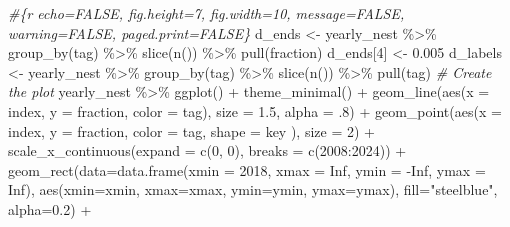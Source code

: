 \documentclass[
]{article}
\newenvironment{Shaded}{\begin{snugshade}}{\end{snugshade}}
\newcommand{\AttributeTok}[1]{\textcolor[rgb]{0.77,0.63,0.00}{#1}}
\newcommand{\CommentTok}[1]{\textcolor[rgb]{0.56,0.35,0.01}{\textit{#1}}}
\newcommand{\ConstantTok}[1]{\textcolor[rgb]{0.00,0.00,0.00}{#1}}
\newcommand{\DecValTok}[1]{\textcolor[rgb]{0.00,0.00,0.81}{#1}}
\newcommand{\FloatTok}[1]{\textcolor[rgb]{0.00,0.00,0.81}{#1}}
\newcommand{\FunctionTok}[1]{\textcolor[rgb]{0.00,0.00,0.00}{#1}}
\newcommand{\NormalTok}[1]{#1}
\newcommand{\OtherTok}[1]{\textcolor[rgb]{0.56,0.35,0.01}{#1}}
\newcommand{\SpecialCharTok}[1]{\textcolor[rgb]{0.00,0.00,0.00}{#1}}
\newcommand{\StringTok}[1]{\textcolor[rgb]{0.31,0.60,0.02}{#1}}
\begin{document}
\begin{Shaded}
\begin{Highlighting}[]
\CommentTok{\#\{r echo=FALSE, fig.height=7, fig.width=10, message=FALSE, warning=FALSE, paged.print=FALSE\}}
\NormalTok{d\_ends }\OtherTok{\textless{}{-}}\NormalTok{ yearly\_nest }\SpecialCharTok{\%\textgreater{}\%} 
  \FunctionTok{group\_by}\NormalTok{(tag) }\SpecialCharTok{\%\textgreater{}\%} 
  \FunctionTok{slice}\NormalTok{(}\FunctionTok{n}\NormalTok{()) }\SpecialCharTok{\%\textgreater{}\%} 
  \FunctionTok{pull}\NormalTok{(fraction)}
\NormalTok{d\_ends[}\DecValTok{4}\NormalTok{] }\OtherTok{\textless{}{-}} \FloatTok{0.005}
\NormalTok{d\_labels }\OtherTok{\textless{}{-}}\NormalTok{ yearly\_nest }\SpecialCharTok{\%\textgreater{}\%} 
  \FunctionTok{group\_by}\NormalTok{(tag) }\SpecialCharTok{\%\textgreater{}\%} 
  \FunctionTok{slice}\NormalTok{(}\FunctionTok{n}\NormalTok{()) }\SpecialCharTok{\%\textgreater{}\%} 
  \FunctionTok{pull}\NormalTok{(tag)}
\CommentTok{\# Create the plot }
\NormalTok{yearly\_nest }\SpecialCharTok{\%\textgreater{}\%} 
  \FunctionTok{ggplot}\NormalTok{() }\SpecialCharTok{+}
  \FunctionTok{theme\_minimal}\NormalTok{() }\SpecialCharTok{+}
  \FunctionTok{geom\_line}\NormalTok{(}\FunctionTok{aes}\NormalTok{(}\AttributeTok{x =}\NormalTok{ index, }\AttributeTok{y =}\NormalTok{ fraction, }\AttributeTok{color =}\NormalTok{ tag), }\AttributeTok{size =} \FloatTok{1.5}\NormalTok{, }\AttributeTok{alpha =}\NormalTok{ .}\DecValTok{8}\NormalTok{) }\SpecialCharTok{+}
  \FunctionTok{geom\_point}\NormalTok{(}\FunctionTok{aes}\NormalTok{(}\AttributeTok{x =}\NormalTok{ index, }\AttributeTok{y =}\NormalTok{ fraction, }\AttributeTok{color =}\NormalTok{ tag, }\AttributeTok{shape =}\NormalTok{ key ), }\AttributeTok{size =} \DecValTok{2}\NormalTok{) }\SpecialCharTok{+}
  \FunctionTok{scale\_x\_continuous}\NormalTok{(}\AttributeTok{expand =} \FunctionTok{c}\NormalTok{(}\DecValTok{0}\NormalTok{, }\DecValTok{0}\NormalTok{), }\AttributeTok{breaks =} \FunctionTok{c}\NormalTok{(}\DecValTok{2008}\SpecialCharTok{:}\DecValTok{2024}\NormalTok{)) }\SpecialCharTok{+}
  \FunctionTok{geom\_rect}\NormalTok{(}\AttributeTok{data=}\FunctionTok{data.frame}\NormalTok{(}\AttributeTok{xmin =} \DecValTok{2018}\NormalTok{, }\AttributeTok{xmax =} \ConstantTok{Inf}\NormalTok{, }\AttributeTok{ymin =} \SpecialCharTok{{-}}\ConstantTok{Inf}\NormalTok{, }\AttributeTok{ymax =} \ConstantTok{Inf}\NormalTok{),}
            \FunctionTok{aes}\NormalTok{(}\AttributeTok{xmin=}\NormalTok{xmin, }\AttributeTok{xmax=}\NormalTok{xmax, }\AttributeTok{ymin=}\NormalTok{ymin, }\AttributeTok{ymax=}\NormalTok{ymax), }\AttributeTok{fill=}\StringTok{"steelblue"}\NormalTok{, }\AttributeTok{alpha=}\FloatTok{0.2}\NormalTok{) }\SpecialCharTok{+}

\end{Highlighting}
\end{Shaded}
\end{document}
